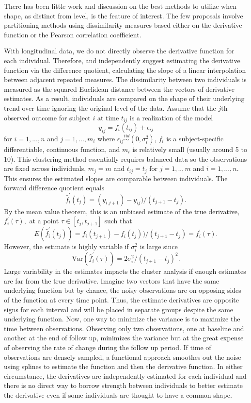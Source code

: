\documentclass[12pt]{article}
\begin{document}
There has been little work and discussion on the best methods to utilize when shape, as distinct from level, is the feature of interest. The few proposals involve partitioning methods using dissimilarity measures based either on the derivative function or the Pearson correlation coefficient. 

With longitudinal data, we do not directly observe the derivative function for each individual. Therefore, \textcite{moller2003} and \textcite{d2000} independently suggest estimating the derivative function via the difference quotient, calculating the slope of a linear interpolation between adjacent repeated measures. The dissimilarity between two individuals is measured as the squared Euclidean distance between the vectors of derivative estimates. As a result, individuals are compared on the shape of their underlying trend over time ignoring the original level of the data. Assume that the $j$th observed outcome for subject $i$ at time $t_{ij}$ is a realization of the model
$$y_{ij}= f_i(t_{ij})+\epsilon_{ij}$$
for $i=1,...,n$ and $j=1,...,m_{i}$ where $\epsilon_{ij}\overset{iid}{\sim} (0,\sigma_{i}^{2})$, $f_{i}$ is a subject-specific differentiable, continuous function, and $m_{i}$ is relatively small (usually around 5 to 10). This clustering method essentially requires balanced data so the observations are fixed across individuals, $m_{j}=m$ and $t_{ij} = t_{j}$ for $j=1,..,m$ and $i=1,...,n$. This ensures the estimated slopes are comparable between individuals. The forward difference quotient equals 
$$\hat{f}_{i}^{'}(t_{j}) = (y_{i\;j+1})-y_{ij})/(t_{j+1}-t_j).$$
By the mean value theorem, this is an unbiased estimate of the true derivative, $f_{i}^{'}(\tau),$ at a point $\tau\in[t_{j},t_{j+1}]$ such that
$$E(\hat{f}_{i}^{'}(t_{j})) = f_i(t_{j+1})-f_i(t_j))/(t_{j+1}-t_j) =f_{i}^{'}(\tau). $$
However, the estimate is highly variable if $\sigma_{i}^{2}$ is large since
$$\text{Var}(\hat{f}_{i}^{'}(\tau)) =  2\sigma^{2}_{i}/ (t_{j+1}-t_j)^{2}.$$
Large variability in the estimates impacts the cluster analysis if enough estimates are far from the true derivative. Imagine two vectors that have the same underlying function but by chance, the noisy observations are on opposing sides of the function at every time point. Thus, the estimate derivatives are opposite signs for each interval and will be placed in separate groups despite the same underlying function. Now, one way to minimize the variance is to maximize the time between observations. Observing only two observations, one at baseline and another at the end of follow up, minimizes the variance but at the great expense of observing the rate of change during the follow up period. If time of observations are densely sampled, a functional approach smoothes out the noise using splines to estimate the function and then the derivative function. In either circumstance, the derivatives are independently estimated for each individual and there is no direct way to borrow strength between individuals to better estimate the derivative even if some individuals are thought to have a common shape.
\end{document}
